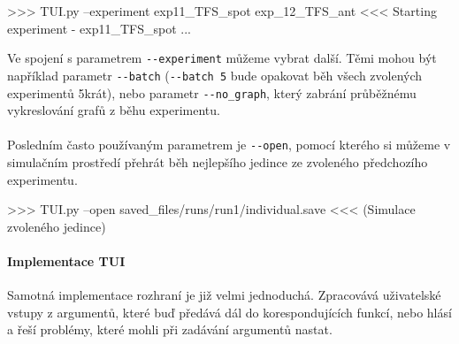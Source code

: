 \begin{code}
>>> TUI.py --experiment exp11_TFS_spot exp_12_TFS_ant
<<< Starting experiment - exp11_TFS_spot 
    ...
\end{code}

Ve spojení s parametrem \texttt{-{}-experiment} můžeme vybrat další. Těmi mohou
být například parametr \texttt{-{}-batch} (\texttt{-{}-batch 5} bude opakovat
běh všech zvolených experimentů 5krát), nebo parametr \texttt{-{}-no\_graph},
který zabrání průběžnému vykreslování grafů z běhu experimentu.

\paragraph{}
Posledním často používaným parametrem je \texttt{-{}-open}, pomocí kterého
si můžeme v simulačním prostředí přehrát běh nejlepšího jedince ze zvoleného
předchozího experimentu.
\begin{code}
>>> TUI.py --open saved_files/runs/run1/individual.save
<<< (Simulace zvoleného jedince)
\end{code}

\paragraph{Implementace TUI}
Samotná implementace rozhraní je již velmi jednoduchá. Zpracovává uživatelské
vstupy z argumentů, které buď předává dál do korespondujících funkcí, nebo
hlásí a řeší problémy, které mohli při zadávání argumentů nastat.
